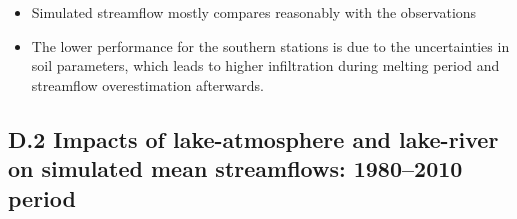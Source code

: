 \documentclass[a0,landscape]{a0poster}
\begin{document}
\begin{multicols*}{3}
\begin{minipage}[c]{0.50\linewidth}
\begin{center}
\end{center}
\end{minipage}
%
\begin{tcolorbox}[colback=white,colframe=green!40!black]
\begin{itemize}
  \item Simulated streamflow mostly compares reasonably with the observations
  \item The lower performance for the southern stations is due to the uncertainties in soil parameters, which leads to higher infiltration during melting period and streamflow overestimation afterwards.
\end{itemize}
\end{tcolorbox}

\subsection*{D.2 Impacts of lake-atmosphere and lake-river on simulated mean streamflows: 1980--2010 period}

\begin{minipage}{\linewidth}
  \center
\end{minipage}


\end{multicols*}
\end{document}
